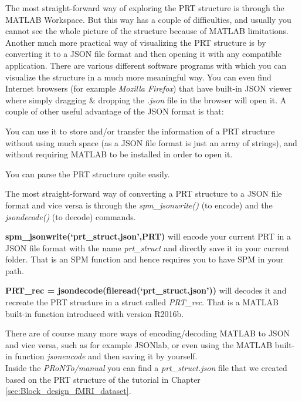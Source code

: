 The most straight-forward way of exploring the PRT structure is through the MATLAB Workspace. But this way has a couple of difficulties, and usually you cannot see the whole picture of the structure because of MATLAB limitations.
\\

Another much more practical way of visualizing the PRT structure is by converting it to a JSON file format and then opening it with any compatible application. There are various different software programs with which you can visualize the structure in a much more meaningful way. You can even find Internet browsers (for example \textit{Mozilla Firefox}) that have built-in JSON viewer where simply dragging \& dropping the \textit{.json} file in the browser will open it. A couple of other useful advantage of the JSON format is that:

\bi
\item You can use it to store and/or transfer the information of a PRT structure without using much space (as a JSON file format is just an array of strings), and without requiring MATLAB to be installed in order to open it.

\item You can parse the PRT structure quite easily.
\ei

The most straight-forward way of converting a PRT structure to a JSON file format and vice versa is through the \textit{spm\_jsonwrite()} (to encode) and the \textit{jsondecode()} (to decode) commands.

\bi
\item \textbf{spm\_jsonwrite(`prt\_struct.json',PRT)} will encode your current PRT in a JSON file format with the name \textit{prt\_struct} and directly save it in your current folder. That is an SPM function and hence requires you to have SPM in your path.

\item \textbf{PRT\_rec = jsondecode(fileread(`prt\_struct.json'))} will decodes it and recreate the PRT structure in a struct called \textit{PRT\_rec}. That is a MATLAB built-in function introduced with version R2016b.
\ei

There are of course many more ways of encoding/decoding MATLAB to JSON and vice versa, such as for example JSONlab, or even using the MATLAB built-in function \textit{jsonencode} and then saving it by yourself.
\\

Inside the \textit{PRoNTo/manual} you can find a \textit{prt\_struct.json} file that we created based on the PRT structure of the tutorial in Chapter \ref{sec:Block_design_fMRI_dataset}.














